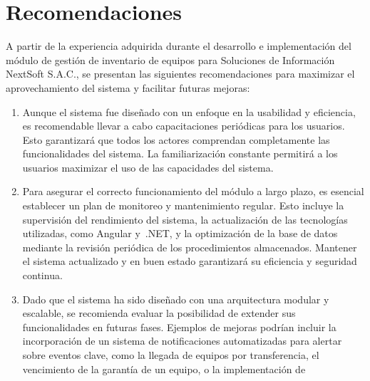\documentclass[stu, 12pt, letterpaper, donotrepeattitle, floatsintext, natbib]{apa7}
\begin{document}
\section{Recomendaciones}
A partir de la experiencia adquirida durante el desarrollo e implementación del módulo de gestión de inventario de equipos para Soluciones de
Información NextSoft S.A.C., se presentan las siguientes recomendaciones para maximizar el aprovechamiento del sistema y facilitar futuras
mejoras:
\begin{enumerate}
    \item %
          Aunque el sistema fue diseñado con un enfoque en la usabilidad y eficiencia, es recomendable llevar a cabo capacitaciones periódicas para los
          usuarios. Esto garantizará que todos los actores comprendan completamente las funcionalidades del sistema. La familiarización constante
          permitirá a los usuarios maximizar el uso de las capacidades del sistema.
    \item %
          Para asegurar el correcto funcionamiento del módulo a largo plazo, es esencial establecer un plan de monitoreo y mantenimiento regular. Esto
          incluye la supervisión del rendimiento del sistema, la actualización de las tecnologías utilizadas, como Angular y~.NET, y la optimización de
          la base de datos mediante la revisión periódica de los procedimientos almacenados. Mantener el sistema actualizado y en buen estado garantizará
          su eficiencia y seguridad continua.
    \item %
          Dado que el sistema ha sido diseñado con una arquitectura modular y escalable, se recomienda evaluar la posibilidad de extender sus
          funcionalidades en futuras fases. Ejemplos de mejoras podrían incluir la incorporación de un sistema de notificaciones automatizadas para
          alertar sobre eventos clave, como la llegada de equipos por transferencia, el vencimiento de la garantía de un equipo, o la implementación de

\end{enumerate}
\end{document}
